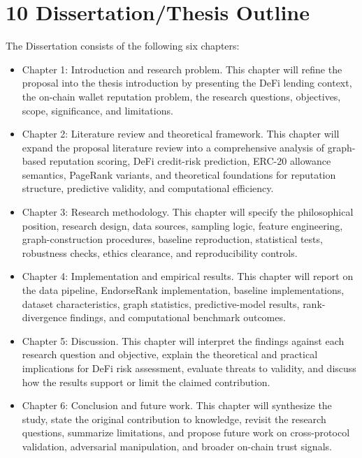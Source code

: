 \clearpage
{}
\section*{10 \textbf{Dissertation/Thesis Outline}}
\label{sec:dissertationthesis-outline}

The Dissertation consists of the following six chapters:


\begin{itemize}
\item[\textendash] Chapter 1: Introduction and research problem. This chapter will refine the proposal into the thesis introduction by presenting the DeFi lending context, the on-chain wallet reputation problem, the research questions, objectives, scope, significance, and limitations.
\item[\textendash] Chapter 2: Literature review and theoretical framework. This chapter will expand the proposal literature review into a comprehensive analysis of graph-based reputation scoring, DeFi credit-risk prediction, ERC-20 allowance semantics, PageRank variants, and theoretical foundations for reputation structure, predictive validity, and computational efficiency.
\item[\textendash] Chapter 3: Research methodology. This chapter will specify the philosophical position, research design, data sources, sampling logic, feature engineering, graph-construction procedures, baseline reproduction, statistical tests, robustness checks, ethics clearance, and reproducibility controls.
\item[\textendash] Chapter 4: Implementation and empirical results. This chapter will report on the data pipeline, EndorseRank implementation, baseline implementations, dataset characteristics, graph statistics, predictive-model results, rank-divergence findings, and computational benchmark outcomes.
\item[\textendash] Chapter 5: Discussion. This chapter will interpret the findings against each research question and objective, explain the theoretical and practical implications for DeFi risk assessment, evaluate threats to validity, and discuss how the results support or limit the claimed contribution.
\item[\textendash] Chapter 6: Conclusion and future work. This chapter will synthesize the study, state the original contribution to knowledge, revisit the research questions, summarize limitations, and propose future work on cross-protocol validation, adversarial manipulation, and broader on-chain trust signals.
\end{itemize}

